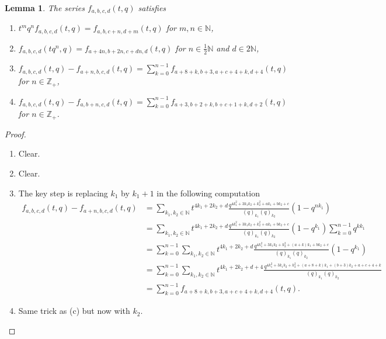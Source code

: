 \documentclass[12pt, reqno]{amsart}
\newtheorem{lemma}[theorem]{Lemma}
\theoremstyle{remark}
\begin{document}
\begin{lemma}
  \label{lmm:1}
  The series $f_{a, b, c, d}(t, q)$ satisfies
  \begin{enumerate}[label={(\alph*)}]
  \item $t^mq^nf_{a, b, c, d}(t, q) = f_{a, b, c + n, d + m}(t, q)$ for $m, n \in \mathbb{N}$,
  \item $f_{a, b, c, d}(tq^n, q) = f_{a + 4n, b + 2n, c + dn, d}(t, q)$ for $n \in \frac{1}{2}\mathbb{N}$ and $ d \in 2\mathbb{N}$,
  \item $f_{a, b, c, d}(t, q) - f_{a + n, b, c, d}(t, q) = \sum_{k = 0}^{n - 1}f_{a + 8 + k, b + 3, a + c + 4 + k, d + 4}(t, q)$ for $n \in \mathbb{Z}_+$,
  \item $f_{a, b, c, d}(t, q) - f_{a, b + n, c, d}(t, q) = \sum_{k = 0}^{n - 1}f_{a + 3, b + 2 + k, b + c + 1 + k, d + 2}(t, q)$ for $n \in \mathbb{Z}_+$.
  \end{enumerate}
\end{lemma}

\begin{proof}
  \begin{enumerate}[label=(\alph*)]
  \item Clear.
  \item Clear.
  \item The key step is replacing $k_1$ by $k_1 + 1$ in the following computation
    \begin{align*}
      f_{a, b, c, d}(t, q) - f_{a + n, b, c, d}(t, q) &= \sum_{k_1, k_2 \in \mathbb{N}}t^{4k_1 + 2k_2 + d}\frac{q^{4k_1^2 + 3k_1k_2 + k_2^2 + ak_1 + bk_2 + c}}{(q)_{k_1}(q)_{k_2}}(1 - q^{nk_1}) \\
      &= \sum_{k_1, k_2 \in \mathbb{N}}t^{4k_1 + 2k_2 + d}\frac{q^{4k_1^2 + 3k_1k_2 + k_2^2 + ak_1 + bk_2 + c}}{(q)_{k_1}(q)_{k_2}}(1 - q^{k_1})\sum_{k = 0}^{n - 1}q^{kk_1} \\
      &= \sum_{k = 0}^{n - 1}\sum_{k_1, k_2 \in \mathbb{N}}t^{4k_1 + 2k_2 + d}\frac{q^{4k_1^2 + 3k_1k_2 + k_2^2 + (a + k)k_1 + bk_2 + c}}{(q)_{k_1}(q)_{k_2}}(1 - q^{k_1}) \\
      &= \sum_{k = 0}^{n - 1}\sum_{k_1, k_2 \in \mathbb{N}}t^{4k_1 + 2k_2 + d + 4}\frac{q^{4k_1^2 + 3k_1k_2 + k_2^2 + (a + 8 + k)k_1 + (b + 3)k_2 + a + c + 4 + k}}{(q)_{k_1}(q)_{k_2}} \\
      &= \sum_{k = 0}^{n - 1}f_{a + 8 + k, b + 3, a + c + 4 + k, d + 4}(t, q).
    \end{align*}
  \item Same trick as (c) but now with $k_2$.
  \end{enumerate}
\end{proof}
\end{document}
